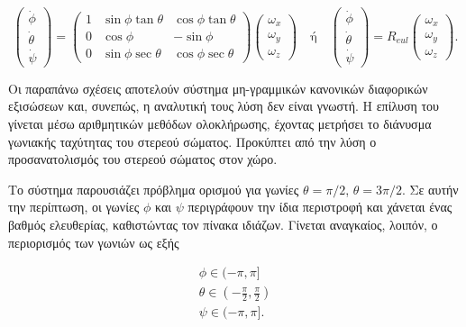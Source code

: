 \begin{equation}
    \begin{pmatrix}
        {\dot{\phi}} \\
        {\dot{\theta}} \\
        {\dot{\psi}}
    \end{pmatrix} = 
    \begin{pmatrix}
        1 & \sin\phi \tan\theta & \cos\phi \tan\theta \\
        0 & \cos\phi & -\sin\phi \\
        0 & \sin\phi \sec\theta & \cos\phi \sec\theta 
    \end{pmatrix}
    \begin{pmatrix}
        {\omega_{x}} \\
        {\omega_{y}} \\
        {\omega_{z}}
    \end{pmatrix}
    \label{knm:rot_knm} \quad\text{ή}\quad  
    \begin{pmatrix}
        {\dot{\phi}} \\
        {\dot{\theta}} \\
        {\dot{\psi}}
    \end{pmatrix} = R_{eul}
    \begin{pmatrix}
        {\omega_{x}} \\
        {\omega_{y}} \\
        {\omega_{z}}
    \end{pmatrix}. 
\end{equation}

Οι παραπάνω σχέσεις αποτελούν σύστημα μη-γραμμικών κανονικών διαφορικών 
εξισώσεων και, συνεπώς, η αναλυτική τους λύση δεν είναι γνωστή. Η επίλυση του 
γίνεται μέσω αριθμητικών μεθόδων ολοκλήρωσης, έχοντας μετρήσει το διάνυσμα 
γωνιακής ταχύτητας του στερεού σώματος. Προκύπτει από την λύση ο 
προσανατολισμός του στερεού σώματος στον χώρο.

Το σύστημα παρουσιάζει πρόβλημα ορισμού για γωνίες \(\theta = \pi/2\), \(\theta 
= 3\pi/2\). Σε αυτήν την περίπτωση, οι γωνίες \(\phi\) και \(\psi\) περιγράφουν 
την ίδια περιστροφή και χάνεται ένας βαθμός ελευθερίας, καθιστώντας τον πίνακα 
ιδιάζων. Γίνεται αναγκαίος, λοιπόν, ο περιορισμός των γωνιών ως εξής

\begin{gather*}
    \phi \in (-\pi, \pi ] \\
    \theta \in \left(-\frac{\pi}{2}, \frac{\pi}{2} \right) \\
    \psi \in (-\pi, \pi].
\end{gather*}

